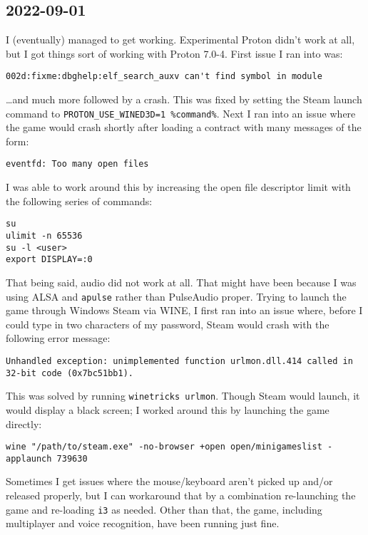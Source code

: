 \documentclass{article}
\begin{document}
\subsection{2022-09-01}
I (eventually) managed to get  working.  Experimental Proton didn't work at all, but I got things sort of working with Proton 7.0-4.  First issue I ran into was:
\begin{verbatim}
002d:fixme:dbghelp:elf_search_auxv can't find symbol in module
\end{verbatim}
\ldots and much more followed by a crash.  This was fixed by setting the Steam launch command to \verb|PROTON_USE_WINED3D=1 %command%|.  Next I ran into an issue where the game would crash shortly after loading a contract with many messages of the form:
\begin{verbatim}
eventfd: Too many open files
\end{verbatim}
I was able to work around this by increasing the open file descriptor limit with the following series of commands:
\begin{verbatim}
su
ulimit -n 65536
su -l <user>
export DISPLAY=:0
\end{verbatim}
That being said, audio did not work at all.  That might have been because I was using ALSA and \texttt{apulse} rather than PulseAudio proper.  Trying to launch the game through Windows Steam via WINE, I first ran into an issue where, before I could type in two characters of my password, Steam would crash with the following error message:
\begin{verbatim}
Unhandled exception: unimplemented function urlmon.dll.414 called in 32-bit code (0x7bc51bb1).
\end{verbatim}
This was solved by running \texttt{winetricks urlmon}.  Though Steam would launch, it would display a black screen; I worked around this by launching the game directly:
\begin{verbatim}
wine "/path/to/steam.exe" -no-browser +open open/minigameslist -applaunch 739630
\end{verbatim}
Sometimes I get issues where the mouse/keyboard aren't picked up and/or released properly, but I can workaround that by a combination re-launching the game and re-loading \texttt{i3} as needed.  Other than that, the game, including multiplayer and voice recognition, have been running just fine.
\end{document}
